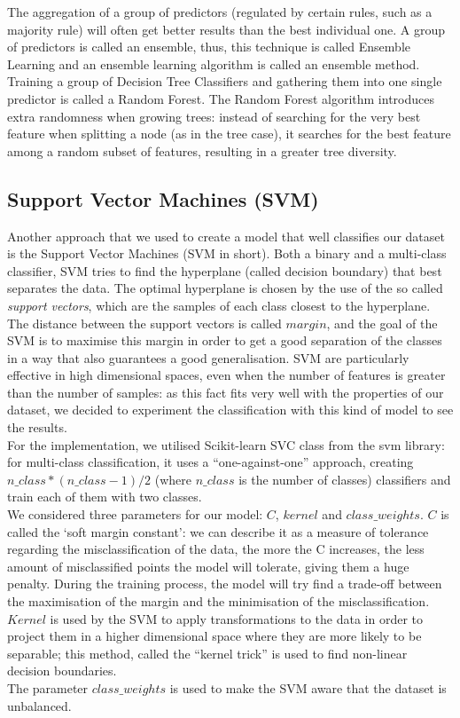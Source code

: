 \documentclass[12pt]{article}
\begin{document}
The aggregation of a group of predictors (regulated by certain rules, such as a majority rule) will often get better results than the best individual one. A group of predictors is called an ensemble, thus, this technique is called Ensemble Learning and an ensemble learning algorithm is called an ensemble method.
Training a group of Decision Tree Classifiers and gathering them into one single predictor is called a Random Forest.
The Random Forest algorithm introduces extra randomness when growing trees: instead of searching for the very best feature when splitting a node (as in the tree case), it searches for the best feature among a random subset of features, resulting in a greater tree diversity.


\subsection{Support Vector Machines (SVM)}
Another approach that we used to create a model that well classifies our dataset is the Support Vector Machines (SVM in short). Both a binary and a multi-class classifier, SVM tries to find the hyperplane (called decision boundary) that best separates the data. The optimal hyperplane is chosen by the use of the so called \textit{support vectors}, which are the samples of each class closest to the hyperplane. The distance between the support vectors is called $margin$, and the goal of the SVM is to maximise this margin in order to get a good separation of the classes in a way that also guarantees a good generalisation. 
SVM are particularly effective in high dimensional spaces, even when the number of features is greater than the number of samples: as this fact fits very well with the properties of our dataset, we decided to experiment the classification with this kind of model to see the results. \\
For the implementation, we utilised Scikit-learn SVC class from the svm library: for multi-class classification, it uses a “one-against-one” approach, creating $n\_class*(n\_class-1)/2$ (where $n\_class$ is the number of classes) classifiers and train each of them with two classes. \\
We considered three parameters for our model: $C$, $kernel$ and $class\_weights$. 
$C$ is called the ‘soft margin constant’: we can describe it as a measure of tolerance regarding the misclassification of the data, the more the C increases, the less amount of misclassified points the model will tolerate, giving them a huge penalty. During the training process, the model will try find a trade-off between the maximisation of the margin and the minimisation of the misclassification. 
$Kernel$ is used by the SVM to apply transformations to the data in order to project them in a higher dimensional space where they are more likely to be separable; this method, called the “kernel trick” is used to find non-linear decision boundaries. \\
The parameter $class\_weights$ is used to make the SVM aware that the dataset is unbalanced. 
\end{document}
